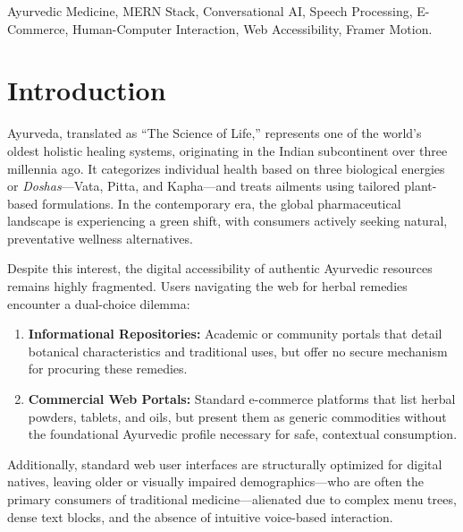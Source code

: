 \documentclass[conference]{IEEEtran}
\begin{document}
\begin{IEEEkeywords}
Ayurvedic Medicine, MERN Stack, Conversational AI, Speech Processing, E-Commerce, Human-Computer Interaction, Web Accessibility, Framer Motion.
\end{IEEEkeywords}

\section{Introduction}
Ayurveda, translated as ``The Science of Life,'' represents one of the world's oldest holistic healing systems, originating in the Indian subcontinent over three millennia ago. It categorizes individual health based on three biological energies or \textit{Doshas}---Vata, Pitta, and Kapha---and treats ailments using tailored plant-based formulations. In the contemporary era, the global pharmaceutical landscape is experiencing a green shift, with consumers actively seeking natural, preventative wellness alternatives. 

Despite this interest, the digital accessibility of authentic Ayurvedic resources remains highly fragmented. Users navigating the web for herbal remedies encounter a dual-choice dilemma:
\begin{enumerate}
    \item \textbf{Informational Repositories:} Academic or community portals that detail botanical characteristics and traditional uses, but offer no secure mechanism for procuring these remedies.
    \item \textbf{Commercial Web Portals:} Standard e-commerce platforms that list herbal powders, tablets, and oils, but present them as generic commodities without the foundational Ayurvedic profile necessary for safe, contextual consumption.
\end{enumerate}

Additionally, standard web user interfaces are structurally optimized for digital natives, leaving older or visually impaired demographics---who are often the primary consumers of traditional medicine---alienated due to complex menu trees, dense text blocks, and the absence of intuitive voice-based interaction.
\end{document}
